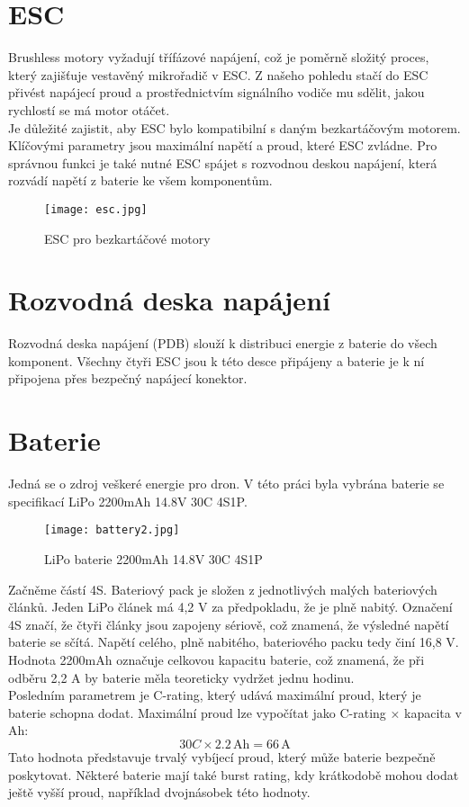 \documentclass[12pt]{report}
\begin{document}
\section{ESC}
Brushless motory vyžadují třífázové napájení, což je poměrně složitý proces, který zajišťuje vestavěný mikrořadič v ESC. Z našeho pohledu stačí do ESC přivést napájecí proud a prostřednictvím signálního vodiče mu sdělit, jakou rychlostí se má motor otáčet.\\
Je důležité zajistit, aby ESC bylo kompatibilní s daným bezkartáčovým motorem. Klíčovými parametry jsou maximální napětí a proud, které ESC zvládne. Pro správnou funkci je také nutné ESC spájet s rozvodnou deskou napájení, která rozvádí napětí z baterie ke všem komponentům.
\begin{figure}[H]
	\centering
	\texttt{[image: esc.jpg]}
	\caption{ESC pro bezkartáčové motory}
	\label{fig:esc.jpg}
\end{figure}

\section{Rozvodná deska napájení}
Rozvodná deska napájení (PDB) slouží k distribuci energie z baterie do všech komponent. Všechny čtyři ESC jsou k této desce připájeny a baterie je k ní připojena přes bezpečný napájecí konektor.

\section{Baterie}
Jedná se o zdroj veškeré energie pro dron. V této práci byla vybrána baterie se specifikací LiPo 2200mAh 14.8V 30C 4S1P.
\begin{figure}[H]
	\centering
	\texttt{[image: battery2.jpg]}
	\caption{LiPo baterie 2200mAh 14.8V 30C 4S1P}
	\label{fig:battery2.jpg}
\end{figure}
Začněme částí 4S. Bateriový pack je složen z jednotlivých malých bateriových článků. Jeden LiPo článek má 4,2 V za předpokladu, že je plně nabitý. Označení 4S značí, že čtyři články jsou zapojeny sériově, což znamená, že výsledné napětí baterie se sčítá. Napětí celého, plně nabitého, bateriového packu tedy činí 16,8 V.\\
Hodnota 2200mAh označuje celkovou kapacitu baterie, což znamená, že při odběru 2,2 A by baterie měla teoreticky vydržet jednu hodinu.\\
Posledním parametrem je C-rating, který udává maximální proud, který je baterie schopna dodat. Maximální proud lze vypočítat jako C-rating × kapacita v Ah:
\[
30C \times 2.2\,\text{Ah} = 66\,\text{A}
\]
Tato hodnota představuje trvalý vybíjecí proud, který může baterie bezpečně poskytovat. Některé baterie mají také burst rating, kdy krátkodobě mohou dodat ještě vyšší proud, například dvojnásobek této hodnoty.
\end{document}
